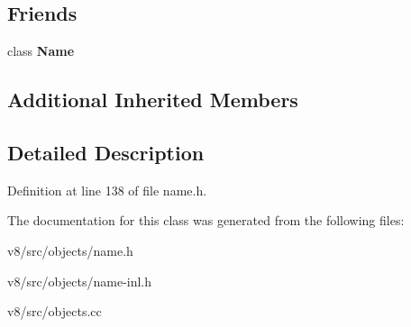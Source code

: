\subsection*{Friends}
\begin{DoxyCompactItemize}
\item 
\mbox{\label{classv8_1_1internal_1_1Symbol_aa5584a36f0e4c358cedb1416f5429051}} 
class {\bfseries Name}
\end{DoxyCompactItemize}
\subsection*{Additional Inherited Members}


\subsection{Detailed Description}


Definition at line 138 of file name.\+h.



The documentation for this class was generated from the following files\+:\begin{DoxyCompactItemize}
\item 
v8/src/objects/name.\+h\item 
v8/src/objects/name-\/inl.\+h\item 
v8/src/objects.\+cc\end{DoxyCompactItemize}
